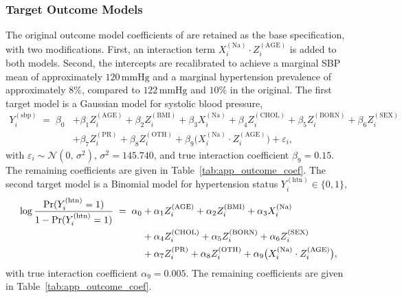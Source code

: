 \subsubsection{Target Outcome Models}
The original outcome model coefficients of \citet{baldoni2021use} are retained as the base specification, with two modifications. First, an interaction term $X_i^{(\mathrm{Na})} \cdot Z_i^{(\mathrm{AGE})}$ is added to both models. Second, the intercepts are recalibrated to achieve a marginal SBP mean of approximately $120\,\mathrm{mmHg}$ and a marginal hypertension prevalence of approximately $8\%$, compared to $122\,\mathrm{mmHg}$ and $10\%$ in the original. The first target model is a Gaussian model for systolic blood pressure,
\begin{align}
    Y_i^{(\mathrm{sbp})} \;=\; \beta_0
    &+ \beta_1 Z_i^{(\mathrm{AGE})}
    + \beta_2 Z_i^{(\mathrm{BMI})}
    + \beta_3 X_i^{(\mathrm{Na})}
    + \beta_4 Z_i^{(\mathrm{CHOL})}
    + \beta_5 Z_i^{(\mathrm{BORN})}
    + \beta_6 Z_i^{(\mathrm{SEX})} \nonumber \\
    &+ \beta_7 Z_i^{(\mathrm{PR})}
    + \beta_8 Z_i^{(\mathrm{OTH})}
    + \beta_9 \bigl(X_i^{(\mathrm{Na})} \cdot Z_i^{(\mathrm{AGE})}\bigr)
    + \varepsilon_i,
    \label{eq:appb_sbp_model}
\end{align}
with $\varepsilon_i \sim \mathcal{N}(0,\, \sigma^2)$, $\sigma^2 = 145.740$, and true interaction coefficient $\beta_9 = 0.15$. The remaining coefficients are given in Table~\ref{tab:app_outcome_coef}. The second target model is a Binomial model for hypertension status $Y_i^{(\mathrm{htn})} \in \{0,1\}$,
\begin{align}
    \log \frac{\Pr(Y_i^{(\mathrm{htn})} = 1)}{%
              1 - \Pr(Y_i^{(\mathrm{htn})} = 1)}
    \;=\; \alpha_0
    &+ \alpha_1 Z_i^{(\mathrm{AGE})}
    + \alpha_2 Z_i^{(\mathrm{BMI})}
    + \alpha_3 X_i^{(\mathrm{Na})}\nonumber \\
    &+ \alpha_4 Z_i^{(\mathrm{CHOL})}
    + \alpha_5 Z_i^{(\mathrm{BORN})}
    + \alpha_6 Z_i^{(\mathrm{SEX})}\nonumber \\
    &+ \alpha_7 Z_i^{(\mathrm{PR})}
    + \alpha_8 Z_i^{(\mathrm{OTH})}
    + \alpha_9 \bigl(X_i^{(\mathrm{Na})} \cdot Z_i^{(\mathrm{AGE})}\bigr),
    \label{eq:appb_htn_model}
\end{align}
with true interaction coefficient $\alpha_9 = 0.005$. The remaining coefficients are given in Table~\ref{tab:app_outcome_coef}.

